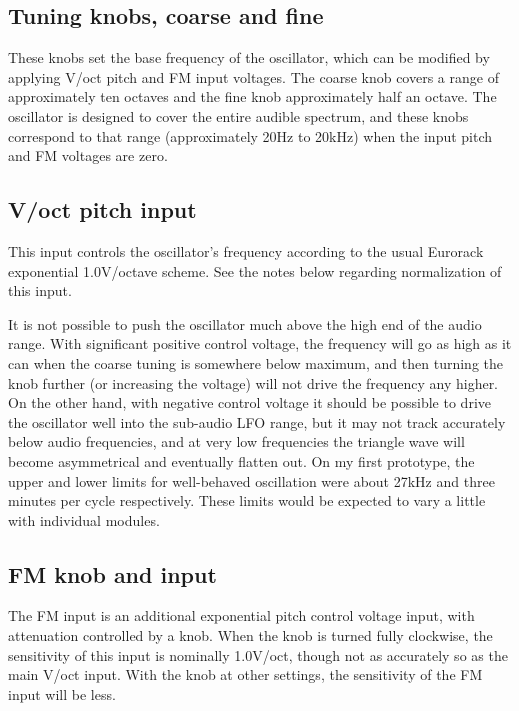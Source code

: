 \subsection{Tuning knobs, coarse and fine}

These knobs set the base frequency of the oscillator, which can be modified
by applying V/oct pitch and FM input voltages.  The coarse knob covers a
range of approximately ten octaves and the fine knob approximately half an
octave.  The oscillator is designed to cover the entire audible spectrum,
and these knobs correspond to that range (approximately 20Hz to 20kHz) when
the input pitch and FM voltages are zero.

\subsection{V/oct pitch input}

This input controls the oscillator's frequency according to the usual
Eurorack exponential 1.0V/octave scheme.  See the notes below regarding
normalization of this input.

It is not possible to push the oscillator much above the high end of the
audio range.  With significant positive control voltage, the frequency will
go as high as it can when the coarse tuning is somewhere below maximum, and
then turning the knob further (or increasing the voltage) will not drive the
frequency any higher.  On the other hand, with negative control voltage it
should be possible to drive the oscillator well into the sub-audio LFO
range, but it may not track accurately below audio frequencies, and at very
low frequencies the triangle wave will become asymmetrical and eventually
flatten out.  On my first prototype, the upper and lower limits for
well-behaved oscillation were about 27kHz and three minutes per cycle
respectively.  These limits would be expected to vary a little with
individual modules.

\subsection{FM knob and input}

The FM input is an additional exponential pitch control voltage input, with
attenuation controlled by a knob.  When the knob is turned fully clockwise,
the sensitivity of this input is nominally 1.0V/oct, though not as
accurately so as the main V/oct input.  With the knob at other settings, the
sensitivity of the FM input will be less.

